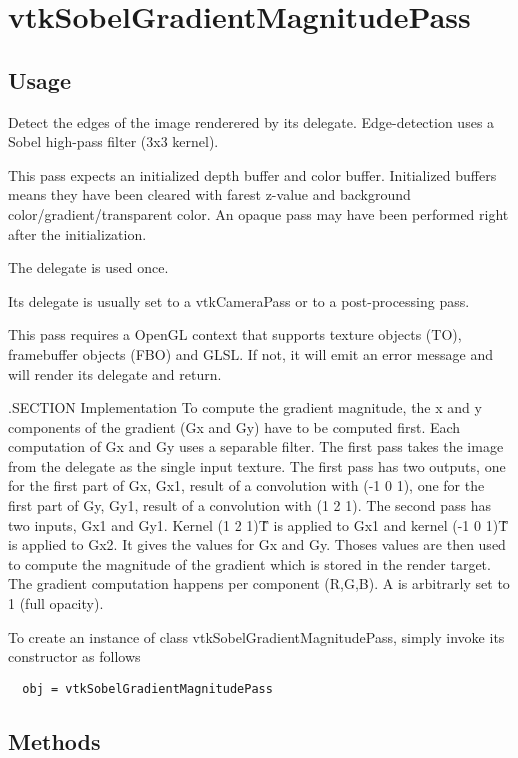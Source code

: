 \section{vtkSobelGradientMagnitudePass}

\subsection{Usage}

 Detect the edges of the image renderered by its delegate. Edge-detection
 uses a Sobel high-pass filter (3x3 kernel).

 This pass expects an initialized depth buffer and color buffer.
 Initialized buffers means they have been cleared with farest z-value and
 background color/gradient/transparent color.
 An opaque pass may have been performed right after the initialization.

 The delegate is used once.

 Its delegate is usually set to a vtkCameraPass or to a post-processing pass.
 
 This pass requires a OpenGL context that supports texture objects (TO),
 framebuffer objects (FBO) and GLSL. If not, it will emit an error message
 and will render its delegate and return.

 .SECTION Implementation
 To compute the gradient magnitude, the x and y components of the gradient
 (Gx and Gy) have to be computed first. Each computation of Gx and Gy uses
 a separable filter.
 The first pass takes the image from the delegate as the single input
 texture.
 The first pass has two outputs, one for the first part of Gx, Gx1, result of
 a convolution with (-1 0 1), one for the first part of Gy, Gy1, result of a
 convolution with (1 2 1).
 The second pass has two inputs, Gx1 and Gy1. Kernel (1 2 1)\^T is applied
 to Gx1 and kernel (-1 0 1)\^T is applied to Gx2. It gives the values for
 Gx and Gy. Thoses values are then used to compute the magnitude of the
 gradient which is stored in the render target.
 The gradient computation happens per component (R,G,B). A is arbitrarly set
 to 1 (full opacity).

 
 

To create an instance of class vtkSobelGradientMagnitudePass, simply
invoke its constructor as follows
\begin{verbatim}
  obj = vtkSobelGradientMagnitudePass
\end{verbatim}
\subsection{Methods}

